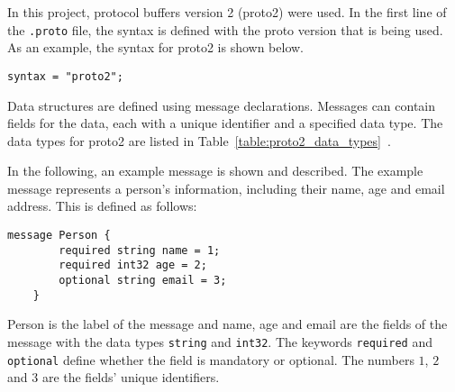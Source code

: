 \documentclass[../MasterThesis.tex]{subfiles}
\begin{document}
In this project, protocol buffers version 2 (proto2) were used. In the first line of the \texttt{.proto} file, the syntax is defined with the proto version that is being used. As an example, the syntax for proto2 is shown below.

\begin{lstlisting}[style=protobufStyle, numbers=none]
	syntax = "proto2";
\end{lstlisting}

\begin{description}[font=\normalfont\color{RedViolet!80!black}, style=nextline]
	

\item[Messages and Fields] 

Data structures are defined using message declarations. Messages can contain fields for the data, each with a unique identifier and a specified data type. The data types for proto2 are listed in Table~\ref{table:proto2_data_types}~\cite{proto2_doc}.

In the following, an example message is shown and described.
The example message represents a person's information, including their name, age and email address. This is defined as follows:

\begin{lstlisting}[style=protobufStyle, numbers=none]
	message Person {
		required string name = 1;
		required int32 age = 2;
		optional string email = 3;
	}
\end{lstlisting}

Person is the label of the message and name, age and email are the fields of the message with the data types \texttt{string} and \texttt{int32}.
The keywords \texttt{required} and \texttt{optional} define whether the field is mandatory or optional.
The numbers $1$, $2$ and $3$ are the fields' unique identifiers.



\end{description}
\end{document}
